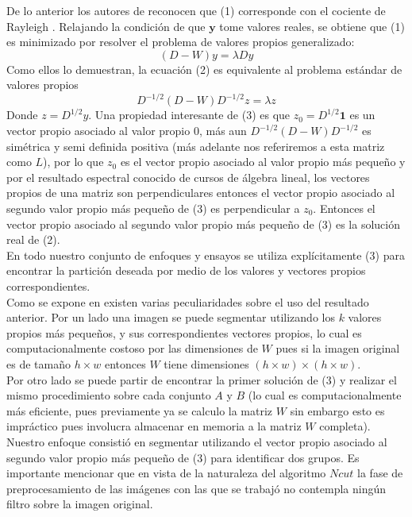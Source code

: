 \documentclass[conference]{IEEEtran}
\begin{document}
De lo anterior los autores de \cite{Ncut} reconocen que (1) corresponde con el cociente de Rayleigh \cite{MatrixC}. Relajando la condición de que $\boldsymbol{y}$
 tome valores reales, se obtiene que (1) es minimizado por resolver el problema de valores propios generalizado:
\begin{equation}
(D-W)y = \lambda D y
\end{equation}
Como ellos lo demuestran, la ecuación (2) es equivalente al problema estándar de valores propios 
\begin{equation}
D^{-1/2}(D-W)D^{-1/2}z = \lambda z\label{eq:laplacian_mat}
\end{equation}
Donde $z=D^{1/2} y$. Una propiedad interesante de (3) es que $z_0= D^{1/2} \boldsymbol{1}$ es un vector propio asociado al valor propio 0, más aun $ D^{-1/2}(D-W)D^{-1/2}$ es simétrica y semi definida positiva (más adelante nos referiremos a esta matriz como $L$), por lo que $z_0$ es el vector propio asociado al valor propio más pequeño y por el resultado espectral conocido de cursos de álgebra lineal, los vectores propios de una matriz son perpendiculares entonces el vector propio asociado al segundo valor propio más pequeño de (3) es perpendicular a $z_0$. Entonces el vector propio asociado al segundo valor propio más pequeño de (3) es la solución real de (2). \\

En todo nuestro conjunto de enfoques y ensayos se utiliza explícitamente (3) para encontrar la partición deseada por medio de los valores y vectores propios correspondientes.\\

Como se expone en \cite{Ncut} existen varias peculiaridades sobre el uso del resultado anterior. Por un lado una imagen se puede segmentar utilizando los $k$ valores propios más pequeños, y sus correspondientes vectores propios, lo cual es computacionalmente costoso por las dimensiones de $W$ pues si la imagen original es de tamaño $h \times w$ entonces $W$ tiene dimensiones $(h\times w)\times (h\times w)$.\\

Por otro lado se puede partir de encontrar la primer solución de (3) y realizar el mismo procedimiento sobre cada conjunto $A$ y $B$ (lo cual es computacionalmente más eficiente, pues previamente ya se calculo la matriz $W$ sin embargo esto es impráctico pues involucra almacenar en memoria a la matriz $W$ completa). \\

Nuestro enfoque consistió en segmentar utilizando el vector propio asociado al segundo valor propio más pequeño de (3) para identificar dos grupos. Es importante mencionar que en vista de la naturaleza del algoritmo $Ncut$ la fase de preprocesamiento de las imágenes con las que se trabajó no contempla ningún filtro sobre la imagen original.   \\
\end{document}
